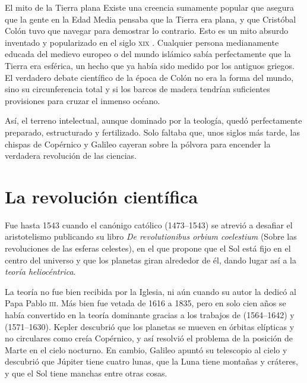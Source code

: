 \begin{digress}{El mito de la Tierra plana}
	Existe una creencia sumamente popular que asegura que la gente en la Edad Media pensaba que la Tierra era plana, y que Cristóbal Colón tuvo que navegar para demostrar lo contrario.
	Esto es un mito absurdo inventado y popularizado en el siglo \textsc{xix} \cite{russell1991flatearth}.
	Cualquier persona medianamente educada del medievo europeo o del mundo islámico sabía perfectamente que la Tierra era esférica, un hecho que ya había sido medido por los antiguos griegos.
	El verdadero debate científico de la época de Colón no era la forma del mundo, sino su circunferencia total y si los barcos de madera tendrían suficientes provisiones para cruzar el inmenso océano.
\end{digress}

Así, el terreno intelectual, aunque dominado por la teología, quedó perfectamente preparado, estructurado y fertilizado.
Solo faltaba que, unos siglos más tarde, las chispas de Copérnico y Galileo cayeran sobre la pólvora para encender la verdadera revolución de las ciencias.

\section{La revolución científica}
\label{sec:larevolucioncientifica}

Fue hasta 1543 cuando el canónigo católico  (1473--1543) se atrevió a desafiar el aristotelismo publicando su libro \emph{De revolutionibus orbium coelestium} (Sobre las revoluciones de las esferas celestes), en el que propone que el Sol está fijo en el centro del universo y que los planetas giran alrededor de él, dando lugar así a la \emph{teoría heliocéntrica}.

La teoría no fue bien recibida por la Iglesia, ni aún cuando su autor la dedicó al Papa Pablo \textsc{iii}.
Más bien fue vetada de 1616 a 1835, pero en solo cien años se había convertido en la teoría dominante gracias a los trabajos de  (1564--1642) y  (1571--1630).
Kepler descubrió que los planetas se mueven en órbitas elípticas y no circulares como creía Copérnico, y así resolvió el problema de la posición de Marte en el cielo nocturno.
En cambio, Galileo apuntó su telescopio al cielo y descubrió que Júpiter tiene cuatro lunas, que la Luna tiene montañas y cráteres, y que el Sol tiene manchas entre otras cosas.

